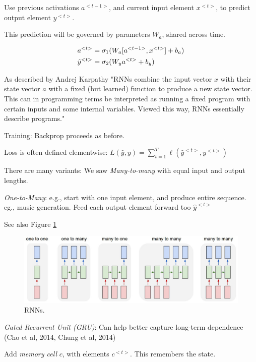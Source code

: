 \documentclass[english]{article}
\begin{document}
Use previous activations $a^{<t-1>}$, and current input element $x^{<t>}$, to predict output element $y^{<t>}$. 

This prediction will be governed by parameters $W_{a}$, shared across time. 

\begin{align*}
a^{<t>} &= \sigma_1(W_{a}[a^{<t-1>},x^{<t>}]+b_a)\\
\hat{y}^{<t>} &= \sigma_2(W_{y}a^{<t>}+b_y)
\end{align*}

As described by Andrej Karpathy "RNNs combine the input vector $x$ with their state vector $a$ with a fixed (but learned) function to produce a new state vector. This can in programming terms be interpreted as running a fixed program with certain inputs and some internal variables. Viewed this way, RNNs essentially describe programs."

\eenum 
\item Training: Backprop proceeds as before. 

Loss is often defined elementwise: $L(\hat y,y) = \sum_{t=1}^T \ell(\hat y^{<t>},y^{<t>})$


\item There are many variants: We saw \emph{Many-to-many} with equal input and output lengths. 

\emph{One-to-Many}: e.g., start with one input element, and produce entire sequence. eg., music generation. Feed each output element forward too $\hat y^{<t>}$

 See also Figure \ref{rnn}

\begin{figure}
  \centering
  \includegraphics[scale=0.3]{diags.jpeg}
  \caption{RNNs.}
  \label{rnn}
\end{figure}


\item \emph{Gated Recurrent Unit (GRU)}: Can help better capture long-term dependence (Cho et al, 2014, Chung et al, 2014) 

Add \emph{memory cell} $c$, with elements $c^{<t>}$. This remembers the state.
\end{document}
